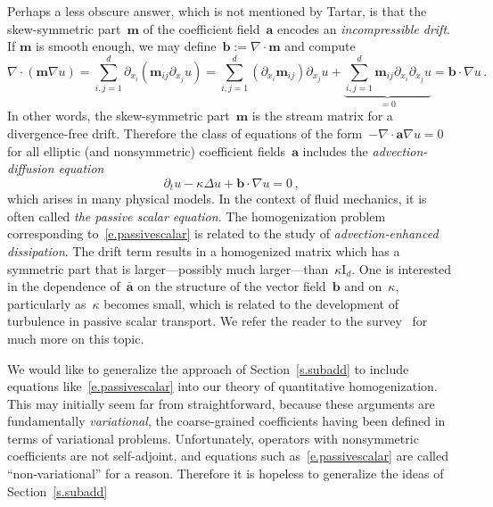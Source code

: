 \documentclass[11pt]{article} %
\numberwithin{equation}{section}
\theoremstyle{definition}
\newcommand*{\Id}{\ensuremath{\mathrm{I}_d}}
\renewcommand{\b}{\ensuremath{\mathbf{b}}}
\renewcommand{\a}{\mathbf{a}}
\newcommand{\m}{\mathbf{m}}
\newcommand{\ahom}{\bar{\a}}
\begin{document}
\smallskip

Perhaps a less obscure answer, which is not mentioned by Tartar, is that the skew-symmetric part~$\m$ of the coefficient field~$\a$ encodes an \emph{incompressible drift}. If $\m$ is smooth enough, we may define~$\b := \nabla \cdot \m$ and compute 
\begin{equation*}
\nabla\cdot ( \m \nabla u) 
=
\sum_{i,j=1}^d 
\partial_{x_i} (  \m_{ij}\partial_{x_j} u) 
=
\sum_{i,j=1}^d 
(\partial_{x_i} \m_{ij})\partial_{x_j} u + \underbrace{\sum_{i,j=1}^d 
\m_{ij}\partial_{x_i} \partial_{x_j} u}_{=0}
=
\b \cdot \nabla u
\,.
\end{equation*}
In other words, the skew-symmetric part~$\m$ is the stream matrix for a divergence-free drift. Therefore the class of equations of the form~$-\nabla \cdot \a\nabla u=0$ for all elliptic (and  nonsymmetric) coefficient fields~$\a$ includes the \emph{advection-diffusion equation}
\begin{equation}
\label{e.passivescalar}
\partial_t u
-\kappa \Delta u + \b \cdot \nabla u = 0
\,,
\end{equation}
which arises in many physical models. In the context of fluid mechanics, it is often called \emph{the passive scalar equation}. 
The homogenization problem corresponding to~\eqref{e.passivescalar} is related to the study of \emph{advection-enhanced dissipation}. The drift term results in a homogenized matrix which has a symmetric part that is larger---possibly much larger---than~$\kappa  \Id$. One is interested in the dependence of~$\ahom$ on the structure of the vector field~$\b$ and on~$\kappa$, particularly as~$\kappa$ becomes small, which is related to the development of turbulence in passive scalar transport. We refer the reader to the survey~\cite{MK} for much more on this topic. 

\smallskip

We would like to generalize the approach of Section~\ref{s.subadd}
to include equations like~\eqref{e.passivescalar} into our theory of quantitative homogenization. This may initially seem far from straightforward, because these arguments are fundamentally \emph{variational}, the coarse-grained coefficients having been defined in terms of variational problems. Unfortunately, operators with nonsymmetric coefficients are not self-adjoint, and equations such as~\eqref{e.passivescalar} are called ``non-variational'' for a reason.
Therefore it is hopeless to generalize the ideas of Section~\ref{s.subadd}

\smallskip
\end{document}
